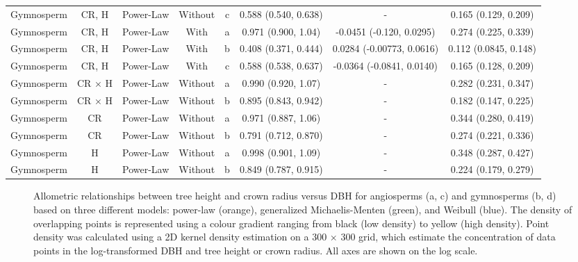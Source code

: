 \documentclass[
  12pt,
  letterpaper,
  DIV=11,
  numbers=noendperiod]{scrartcl}
\makeatletter
\newcommand*\pandocbounded[1]{%
  \sbox\pandoc@box{#1}%
  \Gscale@div\@tempa{\textheight}{\dimexpr\ht\pandoc@box+\dp\pandoc@box\relax}%
  \Gscale@div\@tempb{\linewidth}{\wd\pandoc@box}%
  \ifdim\@tempb\p@<\@tempa\p@\let\@tempa\@tempb\fi%
  \ifdim\@tempa\p@<\p@\scalebox{\@tempa}{\usebox\pandoc@box}%
  \else\usebox{\pandoc@box}%
  \fi%
}
\makeatother
\begin{document}
\begin{longtable*}[t]{cccccccc}
Gymnosperm & CR, H & Power-Law & Without & c & 0.588 (0.540, 0.638) & - & 0.165 (0.129, 0.209)\\
\addlinespace
Gymnosperm & CR, H & Power-Law & With & a & 0.971 (0.900, 1.04) & -0.0451 (-0.120, 0.0295) & 0.274 (0.225, 0.339)\\
Gymnosperm & CR, H & Power-Law & With & b & 0.408 (0.371, 0.444) & 0.0284 (-0.00773, 0.0616) & 0.112 (0.0845, 0.148)\\
Gymnosperm & CR, H & Power-Law & With & c & 0.588 (0.538, 0.637) & -0.0364 (-0.0841, 0.0140) & 0.165 (0.128, 0.209)\\
Gymnosperm & CR × H & Power-Law & Without & a & 0.990 (0.920, 1.07) & - & 0.282 (0.231, 0.347)\\
Gymnosperm & CR × H & Power-Law & Without & b & 0.895 (0.843, 0.942) & - & 0.182 (0.147, 0.225)\\
\addlinespace
Gymnosperm & CR & Power-Law & Without & a & 0.971 (0.887, 1.06) & - & 0.344 (0.280, 0.419)\\
Gymnosperm & CR & Power-Law & Without & b & 0.791 (0.712, 0.870) & - & 0.274 (0.221, 0.336)\\
Gymnosperm & H & Power-Law & Without & a & 0.998 (0.901, 1.09) & - & 0.348 (0.287, 0.427)\\
Gymnosperm & H & Power-Law & Without & b & 0.849 (0.787, 0.915) & - & 0.224 (0.179, 0.279)\\
\bottomrule
\end{longtable*}
\endgroup{}

\newpage

\begin{figure}[H]

\centering{

\pandocbounded{\texttt{[image: ../figs/h\_cr\_dbh\_log.png]}}

}

\caption{\label{fig-compare}Allometric relationships between tree height
and crown radius versus DBH for angiosperms (a, c) and gymnosperms (b,
d) based on three different models: power-law (orange), generalized
Michaelis-Menten (green), and Weibull (blue). The density of overlapping
points is represented using a colour gradient ranging from black (low
density) to yellow (high density). Point density was calculated using a
2D kernel density estimation on a 300 \(\times\) 300 grid, which
estimate the concentration of data points in the log-transformed DBH and
tree height or crown radius. All axes are shown on the log scale.}

\end{figure}%
\end{document}
